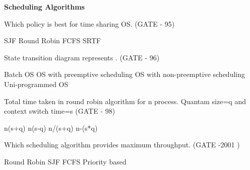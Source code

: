 
\centerline{\textbf{ \LARGE Scheduling Algorithms}}



\begin{questyle}

\question Which policy is best for time sharing OS. (GATE - 95)

\begin{oneparchoices}
   \choice SJF
   \choice Round Robin
   \choice FCFS
   \choice SRTF
\end{oneparchoices}

  \end{questyle}




\begin{questyle}


\question State transition diagram represents . (GATE - 96)
\begin{choices}
   \choice Batch OS
   \choice OS with preemptive scheduling
   \choice OS with non-preemptive scheduling
   \choice Uni-programmed OS
\end{choices}


  \end{questyle}





\begin{questyle}

\question Total time taken in round robin algorithm for n process. Quantam size=q and context switch time=s  (GATE - 98)


\begin{oneparchoices}
   \choice n(s+q)
   \choice n(s-q)
   \choice n/(s+q)
   \choice n-(s*q)
\end{oneparchoices}


  \end{questyle}




\begin{questyle}

  \question Which scheduling algorithm provides maximum throughput. (GATE -2001 )

  \begin{oneparchoices}
    \choice Round Robin
    \choice SJF
    \choice FCFS
    \choice Priority based
  \end{oneparchoices}

  \end{questyle}



